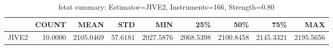 \begin{table}[ht]
\centering
\caption{fstat summary: Estimator=JIVE2, Instruments=166, Strength=0.80}
\begin{tabular}{lrrrrrrrr}
\toprule
 & COUNT & MEAN & STD & MIN & 25\% & 50\% & 75\% & MAX \\
\midrule
JIVE2 & 10.0000 & 2105.0469 & 57.6181 & 2027.5876 & 2068.5398 & 2100.8458 & 2145.3321 & 2195.5656 \\
\bottomrule
\end{tabular}
\end{table}
